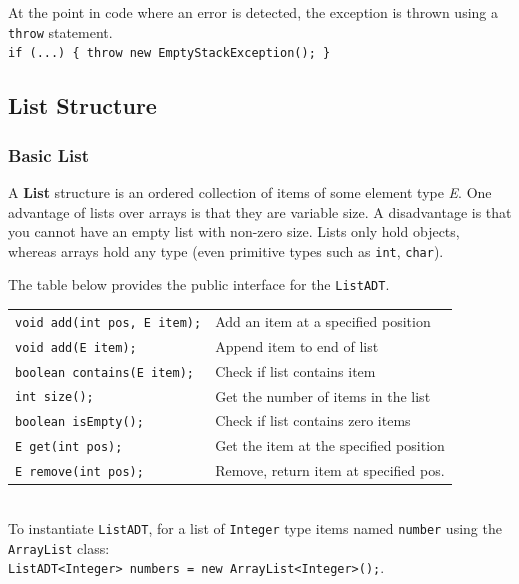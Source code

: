 At the point in code where an error is detected, the exception is thrown using a \texttt{throw} statement. \\

\texttt{if (...) \{ throw new EmptyStackException(); \}} \\

\subsection{List Structure}
\subsubsection{Basic List}
A \textbf{List} structure is an ordered collection of items of some element type \textit{E}. One advantage of lists over arrays is that they are variable size. A disadvantage is that you cannot have an empty list with non-zero size. Lists only hold objects, whereas arrays hold any type (even primitive types such as \texttt{int}, \texttt{char}). 

The table below provides the public interface for the \texttt{ListADT}. \\

\begin{tabular}{p{}p{}}
\texttt{void add(int pos, E item);} & Add an item at a specified position \\
\texttt{void add(E item);} & Append item to end of list \\
\texttt{boolean contains(E item);} & Check if list contains item \\
\texttt{int size();} & Get the number of items in the list \\ 
\texttt{boolean isEmpty();} & Check if list contains zero items \\
\texttt{E get(int pos);} & Get the item at the specified position \\
\texttt{E remove(int pos);} & Remove, return item at specified pos. \\
\end{tabular} \\

To instantiate \texttt{ListADT}, for a list of \texttt{Integer} type items named \texttt{number} using the \texttt{ArrayList} class: \\

\texttt{ListADT<Integer> numbers = new ArrayList<Integer>();}. \\

